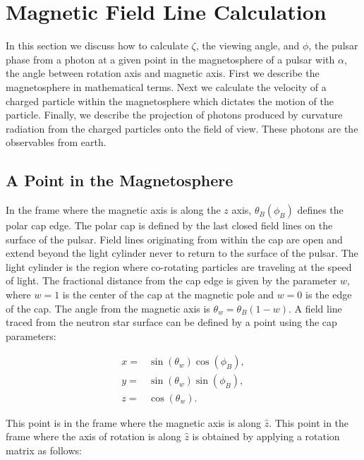 \section{Magnetic Field Line Calculation}
\label{sec:calculation}
In this section we discuss how to calculate $\zeta$, the viewing angle, and $\phi$, the pulsar phase
from a photon at a given point in the magnetosphere of a pulsar
with $\alpha$, the angle between rotation axis and magnetic axis.
First we describe the magnetosphere in mathematical terms.
Next we calculate the velocity of a charged particle within
the magnetosphere which dictates the motion of the particle.  
Finally, we describe the projection of photons produced by curvature
radiation from the charged particles onto the field of view.
These photons are the observables from earth.

\subsection{A Point in the Magnetosphere}

In the frame where the magnetic axis is along the $z$ axis, $\theta_{B}(\phi_{B})$ defines
the polar cap edge. The polar cap is defined by the last closed field lines
on the surface of the pulsar.  Field lines originating from within the cap are open
and extend beyond the light cylinder never to return to the surface
of the pulsar.  The light cylinder is the region where co-rotating
particles are traveling at the speed of light.
The fractional distance from the cap edge is given by the parameter $w$,
where $w=1$ is the center of the cap at the magnetic pole and $w=0$ is the edge of the cap.
The angle from the magnetic axis is
$\theta_w=\theta_{B}(1-w)$.  A field line traced from the neutron 
star surface can be defined by a point using
the cap parameters:

\begin{equation}
\begin{array}{ccc}
x= & \sin(\theta_w) \cos(\phi_B), \\
y= & \sin(\theta_w) \sin(\phi_B), \\
z= & \cos(\theta_w). \end{array}
\end{equation}

This point is
in the frame where the magnetic axis is along $\hat{z}$.
This point in the frame where the axis
of rotation is along $\hat{z}$
is obtained by applying a rotation matrix as follows:

